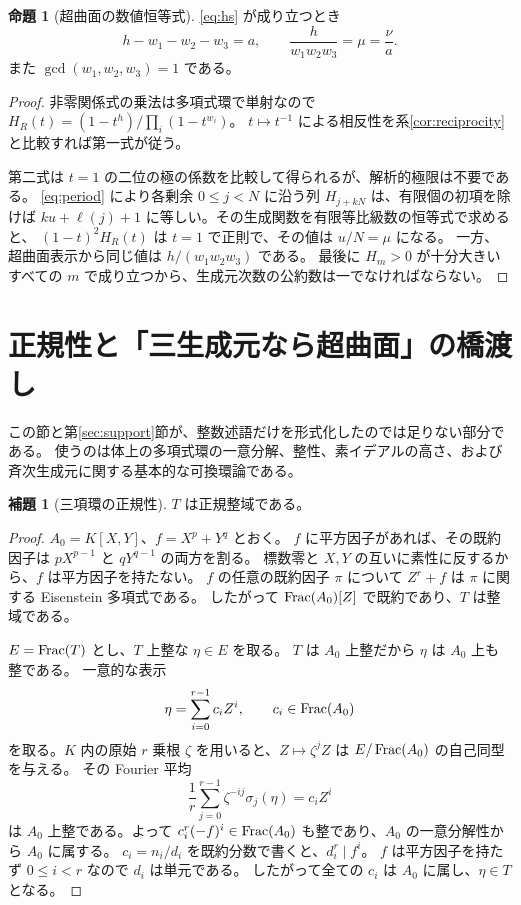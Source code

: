 \documentclass[11pt,a4paper]{ltjsarticle}
\numberwithin{equation}{section}
\theoremstyle{definition}
\newtheorem{proposition}[theorem]{命題}
\newtheorem{lemma}[theorem]{補題}
\begin{document}
\begin{proposition}[超曲面の数値恒等式]\label{prop:numerical}
\eqref{eq:hs} が成り立つとき
\begin{equation}\label{eq:weights}
 h-w_1-w_2-w_3=a,\qquad
 \frac{h}{w_1w_2w_3}=\mu=\frac{\nu}{a}.
\end{equation}
また $\gcd(w_1,w_2,w_3)=1$ である。
\end{proposition}
\begin{proof}
非零関係式の乗法は多項式環で単射なので
$H_R(t)=(1-t^h)/\prod_i(1-t^{w_i})$。
$t\mapsto t^{-1}$ による相反性を系\ref{cor:reciprocity}と比較すれば第一式が従う。

第二式は $t=1$ の二位の極の係数を比較して得られるが、解析的極限は不要である。
\eqref{eq:period} により各剰余 $0\le j<N$ に沿う列 $H_{j+kN}$ は、有限個の初項を除けば
$ku+\ell(j)+1$ に等しい。その生成関数を有限等比級数の恒等式で求めると、
$(1-t)^2H_R(t)$ は $t=1$ で正則で、その値は $u/N=\mu$ になる。
一方、超曲面表示から同じ値は $h/(w_1w_2w_3)$ である。
最後に $H_m>0$ が十分大きいすべての $m$ で成り立つから、生成元次数の公約数は一でなければならない。
\end{proof}

\section{正規性と「三生成元なら超曲面」の橋渡し}\label{sec:normal}
この節と第\ref{sec:support}節が、整数述語だけを形式化したのでは足りない部分である。
使うのは体上の多項式環の一意分解、整性、素イデアルの高さ、および斉次生成元に関する基本的な可換環論である。

\begin{lemma}[三項環の正規性]\label{lem:normalT}
$T$ は正規整域である。
\end{lemma}
\begin{proof}
$A_0=K[X,Y]$、$f=X^p+Y^q$ とおく。
$f$ に平方因子があれば、その既約因子は $pX^{p-1}$ と $qY^{q-1}$ の両方を割る。
標数零と $X,Y$ の互いに素性に反するから、$f$ は平方因子を持たない。
$f$ の任意の既約因子 $\pi$ について $Z^r+f$ は $\pi$ に関する Eisenstein 多項式である。
したがって $\operatorname{Frac}(A_0)[Z]$ で既約であり、$T$ は整域である。

$E=\operatorname{Frac}(T)$ とし、$T$ 上整な $\eta\in E$ を取る。
$T$ は $A_0$ 上整だから $\eta$ は $A_0$ 上も整である。
一意的な表示
\[
 \eta=\sum_{i=0}^{r-1}c_iZ^i,\qquad c_i\in\operatorname{Frac}(A_0)
\]
を取る。$K$ 内の原始 $r$ 乗根 $\zeta$ を用いると、$Z\mapsto\zeta^jZ$ は $E/\operatorname{Frac}(A_0)$ の自己同型を与える。
その Fourier 平均
\[
 \frac1r\sum_{j=0}^{r-1}\zeta^{-ij}\sigma_j(\eta)=c_iZ^i
\]
は $A_0$ 上整である。よって $c_i^r(-f)^i\in\operatorname{Frac}(A_0)$ も整であり、$A_0$ の一意分解性から $A_0$ に属する。
$c_i=n_i/d_i$ を既約分数で書くと、$d_i^r\mid f^i$。
$f$ は平方因子を持たず $0\le i<r$ なので $d_i$ は単元である。
したがって全ての $c_i$ は $A_0$ に属し、$\eta\in T$ となる。
\end{proof}
\end{document}
